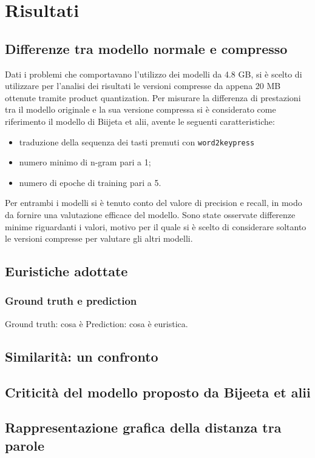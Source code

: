 \chapter{Risultati}
\section{Differenze tra modello normale e compresso}
Dati i problemi che comportavano l'utilizzo dei modelli da 4.8 GB, si è scelto di utilizzare per l'analisi dei risultati le versioni compresse da appena 20 MB ottenute tramite product quantization.
Per misurare la differenza di prestazioni tra il modello originale e la sua versione compressa si è considerato come riferimento il modello di Biijeta et alii, avente le seguenti caratteristiche:
\begin{itemize}
    \item traduzione della sequenza dei tasti premuti con \texttt{word2keypress}
    \item numero minimo di n-gram pari a 1;
    \item numero di epoche di training pari a 5.
\end{itemize}

Per entrambi i modelli si è tenuto conto del valore di precision e recall, in modo da fornire una valutazione efficace del modello.
Sono state osservate differenze minime riguardanti i valori, motivo per il quale si è scelto di considerare soltanto le versioni compresse per valutare gli altri modelli.

\section{Euristiche adottate}
\subsection{Ground truth e prediction}
Ground truth: cosa è
Prediction: cosa è
euristica.

\section{Similarità: un confronto}
\section{Criticità del modello proposto da Bijeeta et alii}
\section{Rappresentazione grafica della distanza tra parole}

\label{ch:risultati}


